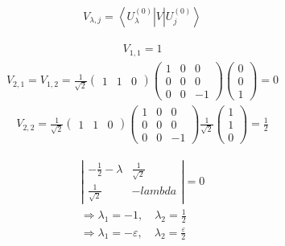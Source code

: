 
\begin{equation}\begin{split}
V_{\lambda,j}=\left\langle U_{\lambda}^{\left(0\right)}\right |V\left |U_j^{\left(0\right)} \right\rangle
\end{split}\end{equation}

\begin{equation}\begin{split}
V_{1,1}=1
\end{split}\end{equation}
\begin{equation}\begin{split}
V_{2,1}=V_{1,2}=\frac{1}{\sqrt{2}}\left(\begin{matrix}1&1&0\end{matrix}\right)\left(\begin{matrix}1&0&0\\0&0&0\\0&0&-1\end{matrix}\right)\left(\begin{matrix}0\\0\\1\end{matrix}\right)=0
\end{split}\end{equation}
\begin{equation}\begin{split}
V_{2,2}=\frac{1}{\sqrt{2}}\left(\begin{matrix}1&1&0\end{matrix}\right)\left(\begin{matrix}1&0&0\\0&0&0\\0&0&-1\end{matrix}\right)\frac{1}{\sqrt{2}}\left(\begin{matrix}1\\1\\0\end{matrix}\right)=\frac{1}{2}
\end{split}\end{equation}


\begin{equation}\begin{split}
\left|\begin{matrix}-\frac{1}{2}-\lambda & \frac{1}{\sqrt{2}}\\\frac{1}{\sqrt{2}}&-lambda\end{matrix}\right|=0\\
\Longrightarrow  \lambda_1=-1, \quad \lambda_2=\frac{1}{2} \\
\Longrightarrow \lambda_1=-\varepsilon, \quad \lambda_2=\frac{\varepsilon}{2} 
\end{split}\end{equation}

